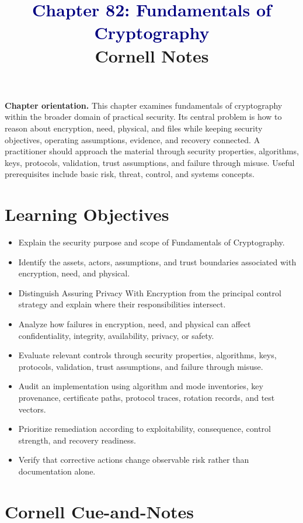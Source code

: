 \documentclass[11pt]{article}
\title{\textcolor{Navy}{Chapter 82: Fundamentals of Cryptography}\\[2mm]\large Cornell Notes}
\author{}
\date{}
\begin{document}
\maketitle
\thispagestyle{fancy}
\vspace{-1.5em}
\begin{orientationbox}
\textbf{Chapter orientation.} This chapter examines fundamentals of cryptography within the broader domain of practical security. Its central problem is how to reason about encryption, need, physical, and files while keeping security objectives, operating assumptions, evidence, and recovery connected. A practitioner should approach the material through security properties, algorithms, keys, protocols, validation, trust assumptions, and failure through misuse. Useful prerequisites include basic risk, threat, control, and systems concepts.
\end{orientationbox}
\section*{Learning Objectives}
\begin{itemize}
\item Explain the security purpose and scope of Fundamentals of Cryptography.
\item Identify the assets, actors, assumptions, and trust boundaries associated with encryption, need, and physical.
\item Distinguish Assuring Privacy With Encryption from the principal control strategy and explain where their responsibilities intersect.
\item Analyze how failures in encryption, need, and physical can affect confidentiality, integrity, availability, privacy, or safety.
\item Evaluate relevant controls through security properties, algorithms, keys, protocols, validation, trust assumptions, and failure through misuse.
\item Audit an implementation using algorithm and mode inventories, key provenance, certificate paths, protocol traces, rotation records, and test vectors.
\item Prioritize remediation according to exploitability, consequence, control strength, and recovery readiness.
\item Verify that corrective actions change observable risk rather than documentation alone.
\end{itemize}
\section*{Cornell Cue-and-Notes}
\end{document}
